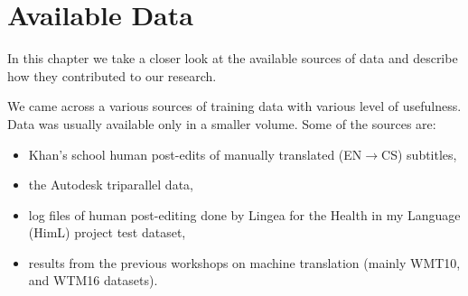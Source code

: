 \chapter{Available Data}
\label{chap:data}




In this chapter we take a closer look at the available
sources of data and describe how they contributed to our research.

We came across a various sources of training data with various level
of usefulness. Data was usually available only in a smaller volume. Some of the sources
are:
\begin{itemize}
\item Khan's school human
post-edits of manually translated (EN$\rightarrow$CS) subtitles,
\item the Autodesk
triparallel data,
\item log files of human post-editing done by Lingea for the
Health in my Language (HimL) project test dataset,


\item results from the previous workshops on machine translation (mainly\linebreak
WMT10,
and WTM16 datasets).
\end{itemize}

